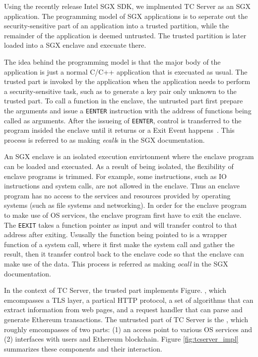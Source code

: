 Using the recently release Intel SGX SDK, we implmented TC Server as an SGX
application.  The programming model of SGX applications is to seperate out the
security-sensitive part of an application into a trusted partition, while the
remainder of the application is deemed untrusted.  The trusted partition is
later loaded into a SGX enclave and execuate there. 

The idea behind the programming model is that the major body of the application
is just a normal C/C++ application that is execuated as usual. The trusted part
is invoked by the application when the application needs to perform a
security-sensitive task, such as to generate a key pair only unknown to the
trusted part. To call a function in the enclave, the untrusted part first
prepare the arguments and issue a \texttt{EENTER} instruction with the address
of functions being called as arguments.  After the issueing of \texttt{EENTER},
control is transferred to the program insided the enclave until it returns or a
Exit Event happens~\cite{sgxman}. This process is referred to as making
\emph{ecall}s in the SGX documentation.

An SGX enclave is an isolated execution envirtonment where the enclave program
can be loaded and execuated. As a result of being isolated, the flexibility of
enclave programs is trimmed. For example, some instructions, such as IO
instructions and system calls, are not allowed in the enclave.
Thus an enclave program has no access to the services and resources provided by
operating systems (such as file systems and networking). In order for the enclave
program to make use of OS services, the enclave program first have to exit the 
enclave. The \texttt{EEXIT} takes a function pointer as input and will transfer
control to that address after exiting. Ususally the function being pointed to
is a wrapper function of a system call, where it first make the system call and
gather the result, then it transfer control back to the enclave code so that the
enclave can make use of the data. This process is referred as making \emph{ocall}
in the SGX documentation.

In the context of TC Server, the trusted part implements Figure. ,
which emcompasses a TLS layer, a partical HTTP protocol, a set of algorithms that
can extract information from web pages, and a request handler that
can parse and generate Ethereum transactions. 
The untrusted part of TC Server is the \medname, which roughly emcompasses of
two parts: (1) an access point to various OS services and (2) interfaces with
users and Ethereum blockchain. Figure \ref{fig:tcserver_impl} summarizes these
components and their interaction.

